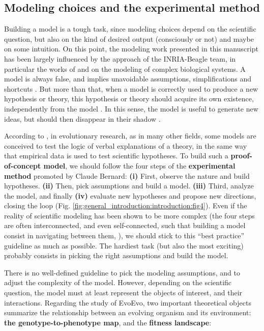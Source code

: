 
\subsection{Modeling choices and the experimental method}
Building a model is a tough task, since modeling choices depend on the scientific question, but also on the kind of desired output (consciously or not) and maybe on some intuition. On this point, the modeling work presented in this manuscript has been largely influenced by the approach of the INRIA-Beagle team, in particular the works of \cite{knibbe-2007} and \cite{beslon-2008} on the modeling of complex biological systems.
A model is always false, and implies unavoidable assumptions, simplifications and shortcuts \citep{banzhaf-et-al-2016}. But more than that, when a model is correctly used to produce a new hypothesis or theory, this hypothesis or theory should acquire its own existence, independently from the model \citep{grimm-1999}. In this sense, the model is useful to generate new ideas, but should then disappear in their shadow \citep{beslon-2008}.

According to \cite{servedio-et-al-2014}, in evolutionary research, as in many other fields, some models are conceived to test the logic of verbal explanations of a theory, in the same way that empirical data is used to test scientific hypotheses. To build such a \textbf{proof-of-concept model}, we should follow the four steps of the \textbf{experimental method} promoted by Claude Bernard: \textbf{(i)} First, observe the nature and build hypotheses. \textbf{(ii)} Then, pick assumptions and build a model. \textbf{(iii)} Third, analyze the model, and finally \textbf{(iv)} evaluate new hypotheses and propose new directions, closing the loop (Fig. \ref{fig:general_introduction:introduction:fig4}). Even if the reality of scientific modeling has been shown to be more complex (the four steps are often interconnected, and even self-connected, such that building a model consist in navigating between them, \citealt{chalmers-1990,beslon-2008}), we should stick to this ``best practice'' guideline as much as possible. The hardiest task (but also the most exciting) probably consists in picking the right assumptions and build the model.

There is no well-defined guideline to pick the modeling assumptions, and to adjust the complexity of the model. However, depending on the scientific question, the model must at least represent the objects of interest, and their interactions. Regarding the study of EvoEvo, two important theoretical objects summarize the relationship between an evolving organism and its environment: \textbf{the genotype-to-phenotype map}, and the \textbf{fitness landscape}:

